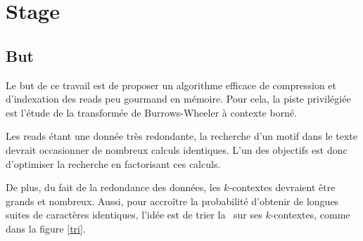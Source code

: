 \section{Stage}

\subsection{But}
Le but de ce travail est de proposer un algorithme efficace de compression et d'indexation des reads peu gourmand en mémoire. Pour cela, la piste privilégiée est l'étude de la transformée de Burrows-Wheeler à contexte borné. 

Les reads étant une donnée très redondante, la recherche d'un motif dans le texte devrait occasionner de nombreux calculs identiques. L'un des objectifs est donc d'optimiser la recherche en factorisant ces calculs. 

De plus, du fait de la redondance des données, les $k$-contextes devraient être grands et nombreux. Aussi, pour accroître la probabilité d'obtenir de longues suites de caractères identiques, l'idée est de trier la \kbwt\ sur ses $k$-contextes, comme dans la figure \ref{tri}.

